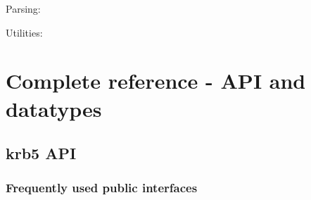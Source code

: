 \documentclass[letterpaper,10pt,english]{sphinxmanual}
\begin{document}
{\hyperref[appdev/refs/api/krb5_sname_to_principal:c.krb5_sname_to_principal]{}}

Parsing:

{\hyperref[appdev/refs/api/krb5_parse_name:c.krb5_parse_name]{}}

{\hyperref[appdev/refs/api/krb5_parse_name_flags:c.krb5_parse_name_flags]{}}

{\hyperref[appdev/refs/api/krb5_unparse_name:c.krb5_unparse_name]{}}

{\hyperref[appdev/refs/api/krb5_unparse_name_flags:c.krb5_unparse_name_flags]{}}

Utilities:

{\hyperref[appdev/refs/api/krb5_is_config_principal:c.krb5_is_config_principal]{}}

{\hyperref[appdev/refs/api/krb5_kuserok:c.krb5_kuserok]{}}

{\hyperref[appdev/refs/api/krb5_set_password:c.krb5_set_password]{}}

{\hyperref[appdev/refs/api/krb5_set_password_using_ccache:c.krb5_set_password_using_ccache]{}}

{\hyperref[appdev/refs/api/krb5_set_principal_realm:c.krb5_set_principal_realm]{}}

{\hyperref[appdev/refs/api/krb5_realm_compare:c.krb5_realm_compare]{}}


\chapter{Complete reference - API and datatypes}
\label{appdev/refs/index:complete-reference-api-and-datatypes}\label{appdev/refs/index::doc}

\section{krb5 API}
\label{appdev/refs/api/index:krb5-api}\label{appdev/refs/api/index::doc}

\subsection{Frequently used public interfaces}
\label{appdev/refs/api/index:frequently-used-public-interfaces}
\end{document}
